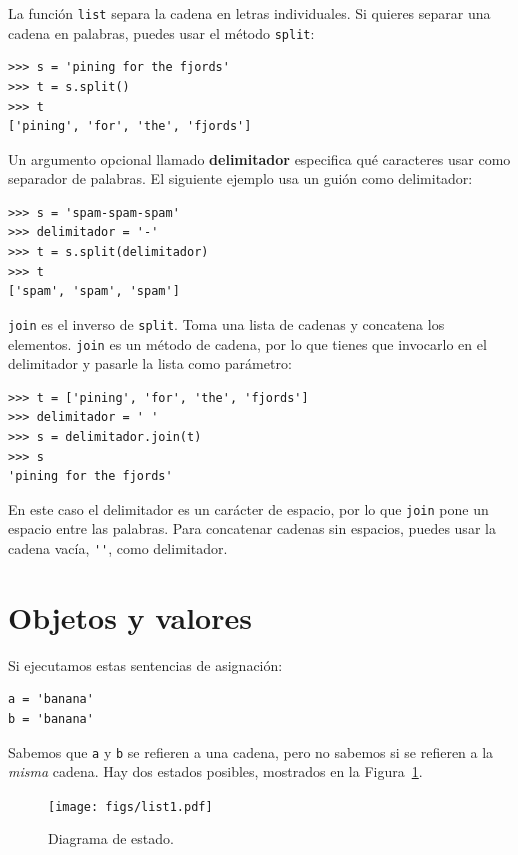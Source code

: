 \documentclass[10pt]{book}
\begin{document}
La función {\tt list} separa la cadena en letras individuales.  Si
quieres separar una cadena en palabras, puedes usar
el método {\tt split}:

\begin{verbatim}
>>> s = 'pining for the fjords'
>>> t = s.split()
>>> t
['pining', 'for', 'the', 'fjords']
\end{verbatim}
%
Un argumento opcional llamado {\bf delimitador} especifica qué
caracteres usar como separador de palabras.
El siguiente ejemplo
usa un guión como delimitador:

\begin{verbatim}
>>> s = 'spam-spam-spam'
>>> delimitador = '-'
>>> t = s.split(delimitador)
>>> t
['spam', 'spam', 'spam']
\end{verbatim}
%
{\tt join} es el inverso de {\tt split}.
Toma una lista de cadenas y
concatena los elementos.  {\tt join} es un método de cadena,
por lo que tienes que invocarlo en el delimitador y pasarle la
lista como parámetro:

\begin{verbatim}
>>> t = ['pining', 'for', 'the', 'fjords']
>>> delimitador = ' '
>>> s = delimitador.join(t)
>>> s
'pining for the fjords'
\end{verbatim}
%
En este caso el delimitador es un carácter de espacio, por lo que
{\tt join} pone un espacio entre las palabras.  Para concatenar
cadenas sin espacios, puedes usar la cadena vacía,
\verb"''", como delimitador.


\section{Objetos y valores}
\label{equivalence}

Si ejecutamos estas sentencias de asignación:

\begin{verbatim}
a = 'banana'
b = 'banana'
\end{verbatim}
%
Sabemos que {\tt a} y {\tt b} se refieren a una
cadena, pero no
sabemos si se refieren a la {\em misma} cadena.
Hay dos estados posibles, mostrados en la Figura~\ref{fig.list1}.

\begin{figure}
\centerline
{\texttt{[image: figs/list1.pdf]}}
\caption{Diagrama de estado.}
\label{fig.list1}
\end{figure}
\end{document}
